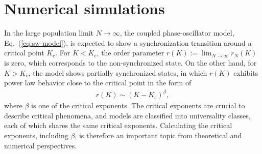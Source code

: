 \section{Numerical simulations}
\label{sec:nu-sim}
In the large population limit $N\to\infty$,
the coupled phase-oscillator model, Eq.~(\ref{eq:sw-model}), is
expected to show a synchronization transition around a critical point $K_{\mathrm{c}}$.
For $K<K_{\mathrm{c}}$, the order parameter $r(K):=\lim_{N\to\infty}r_{N}(K)$ is zero,
which corresponds to the non-synchronized state.
On the other hand, for $K>K_{\mathrm{c}}$,
the model shows partially synchronized states, in which $r(K)$ exhibits power law behavior close to the critical point
in the form of
\begin{align}
  r(K)\sim(K-K_{\mathrm{c}})^{\beta},
\end{align}
where $\beta$ is one of the critical exponents.
The critical exponents are crucial to describe critical phenomena,
and models are classified into universality classes, each of which shares the same critical exponents.
Calculating the critical exponents, including $\beta$, is therefore
an important topic from theoretical and numerical perspectives.

